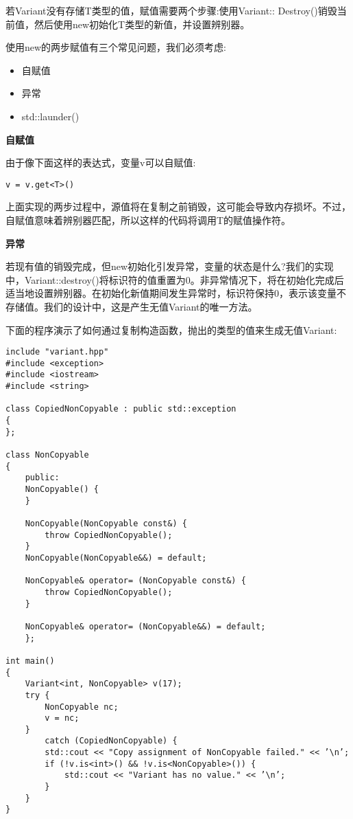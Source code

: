 若Variant没有存储T类型的值，赋值需要两个步骤:使用Variant:: Destroy()销毁当前值，然后使用new初始化T类型的新值，并设置辨别器。

使用new的两步赋值有三个常见问题，我们必须考虑:

\begin{itemize}
\item
自赋值

\item
异常

\item
std::launder()
\end{itemize}

\noindent
\textbf{自赋值}

由于像下面这样的表达式，变量v可以自赋值:

\begin{lstlisting}[style=styleCXX]
v = v.get<T>()
\end{lstlisting}

上面实现的两步过程中，源值将在复制之前销毁，这可能会导致内存损坏。不过，自赋值意味着辨别器匹配，所以这样的代码将调用T的赋值操作符。

\noindent
\textbf{异常}

若现有值的销毁完成，但new初始化引发异常，变量的状态是什么?我们的实现中，Variant::destroy()将标识符的值重置为0。非异常情况下，将在初始化完成后适当地设置辨别器。在初始化新值期间发生异常时，标识符保持0，表示该变量不存储值。我们的设计中，这是产生无值Variant的唯一方法。

下面的程序演示了如何通过复制构造函数，抛出的类型的值来生成无值Variant:

\begin{lstlisting}[style=styleCXX]
include "variant.hpp"
#include <exception>
#include <iostream>
#include <string>

class CopiedNonCopyable : public std::exception
{
};

class NonCopyable
{
	public:
	NonCopyable() {
	}

	NonCopyable(NonCopyable const&) {
		throw CopiedNonCopyable();
	}
	NonCopyable(NonCopyable&&) = default;
	
	NonCopyable& operator= (NonCopyable const&) {
		throw CopiedNonCopyable();
	}

	NonCopyable& operator= (NonCopyable&&) = default;
	};

int main()
{
	Variant<int, NonCopyable> v(17);
	try {
		NonCopyable nc;
		v = nc;
	}
		catch (CopiedNonCopyable) {
		std::cout << "Copy assignment of NonCopyable failed." << ’\n’;
		if (!v.is<int>() && !v.is<NonCopyable>()) {
			std::cout << "Variant has no value." << ’\n’;
		}
	}
}
\end{lstlisting}

